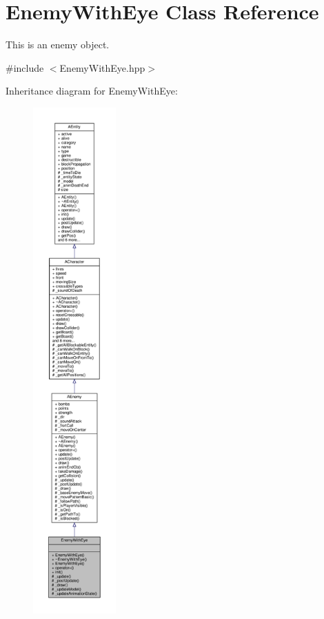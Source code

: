 \hypertarget{class_enemy_with_eye}{}\section{Enemy\+With\+Eye Class Reference}
\label{class_enemy_with_eye}


This is an enemy object.  




{\ttfamily \#include $<$Enemy\+With\+Eye.\+hpp$>$}



Inheritance diagram for Enemy\+With\+Eye\+:
\nopagebreak
\begin{figure}[H]
\begin{center}
\leavevmode
\includegraphics[height=550pt]{class_enemy_with_eye__inherit__graph}
\end{center}
\end{figure}


